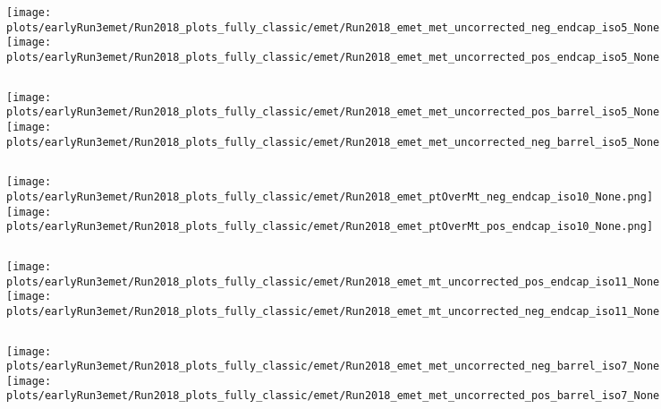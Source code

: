 \documentclass[en,16:9,navbarinfooter]{presentation/sdqbeamer}
\begin{document}
\begin{frame}{\insertsubsection}
   \begin{columns}
   \texttt{[image: plots/earlyRun3emet/Run2018\_plots\_fully\_classic/emet/Run2018\_emet\_met\_uncorrected\_neg\_endcap\_iso5\_None.png]}
   \texttt{[image: plots/earlyRun3emet/Run2018\_plots\_fully\_classic/emet/Run2018\_emet\_met\_uncorrected\_pos\_endcap\_iso5\_None.png]}
\end{columns}
\end{frame}

\begin{frame}{\insertsubsection}
   \begin{columns}
   \texttt{[image: plots/earlyRun3emet/Run2018\_plots\_fully\_classic/emet/Run2018\_emet\_met\_uncorrected\_pos\_barrel\_iso5\_None.png]}
   \texttt{[image: plots/earlyRun3emet/Run2018\_plots\_fully\_classic/emet/Run2018\_emet\_met\_uncorrected\_neg\_barrel\_iso5\_None.png]}
\end{columns}
\end{frame}

\begin{frame}{\insertsubsection}
   \begin{columns}
   \texttt{[image: plots/earlyRun3emet/Run2018\_plots\_fully\_classic/emet/Run2018\_emet\_ptOverMt\_neg\_endcap\_iso10\_None.png]}
   \texttt{[image: plots/earlyRun3emet/Run2018\_plots\_fully\_classic/emet/Run2018\_emet\_ptOverMt\_pos\_endcap\_iso10\_None.png]}
\end{columns}
\end{frame}

\begin{frame}{\insertsubsection}
   \begin{columns}
   \texttt{[image: plots/earlyRun3emet/Run2018\_plots\_fully\_classic/emet/Run2018\_emet\_mt\_uncorrected\_pos\_endcap\_iso11\_None.png]}
   \texttt{[image: plots/earlyRun3emet/Run2018\_plots\_fully\_classic/emet/Run2018\_emet\_mt\_uncorrected\_neg\_endcap\_iso11\_None.png]}
\end{columns}
\end{frame}

\begin{frame}{\insertsubsection}
   \begin{columns}
   \texttt{[image: plots/earlyRun3emet/Run2018\_plots\_fully\_classic/emet/Run2018\_emet\_met\_uncorrected\_neg\_barrel\_iso7\_None.png]}
   \texttt{[image: plots/earlyRun3emet/Run2018\_plots\_fully\_classic/emet/Run2018\_emet\_met\_uncorrected\_pos\_barrel\_iso7\_None.png]}
\end{columns}
\end{frame}
\end{document}
